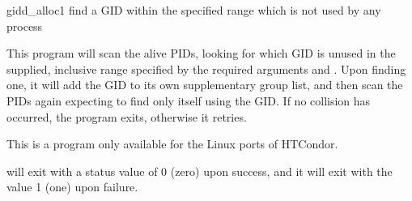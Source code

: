 \begin{ManPage}{\label{man-gidd-alloc}gidd\_alloc}{1}
{find a GID within the specified range which is not used by any process}

\Synopsis {}

\Description 

This program will scan the alive PIDs, looking for which GID is unused in
the supplied, inclusive range specified by the required arguments
 and . 
Upon finding one,
it will add the GID to its own supplementary group list,
and then scan the PIDs again expecting to find only itself using the GID. 
If no collision has occurred, the program exits, otherwise it retries.

	
\GenRem

This is a program only available for the Linux ports of HTCondor.

\ExitStatus

 will exit with a status value of 0 (zero) upon success,
and it will exit with the value 1 (one) upon failure.

\end{ManPage}
